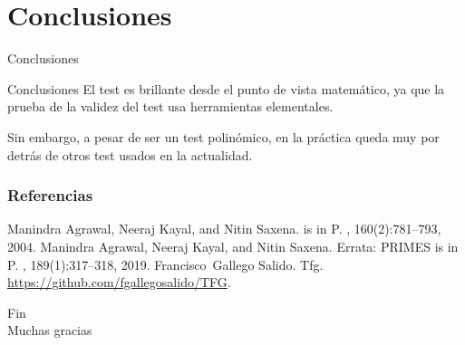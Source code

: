 \documentclass{beamer}
\begin{document}
\section{Conclusiones}

\begin{frame}
	\centering
	\begin{Huge}
		Conclusiones
	\end{Huge}
\end{frame}

\begin{frame}{Conclusiones}
	\onslide<1->El test es brillante desde el punto de vista matemático, ya que la prueba de la validez del test usa herramientas elementales.\break
	
	Sin embargo, a pesar de ser un test polinómico, en la práctica queda muy por detrás de otros test usados en la actualidad.
\end{frame}


\begin{frame}
\frametitle{Referencias}
\footnotesize{
	\begin{thebibliography}{99} %
		Manindra Agrawal, Neeraj Kayal, and Nitin Saxena.
			 is in {P}.
			, 160(2):781--793, 2004.
		Manindra Agrawal, Neeraj Kayal, and Nitin Saxena.
			\newblock Errata: {PRIMES} is in {P}.
			, 189(1):317--318, 2019.
		Francisco~Gallego Salido.
			\newblock Tfg.
			\newblock \url{https://github.com/fgallegosalido/TFG}.
	\end{thebibliography}
}
\end{frame}


\begin{frame}
	\centering
	\begin{huge}
		Fin\\
		\vspace{1cm}
		Muchas gracias
	\end{huge}
\end{frame}

\end{document}
